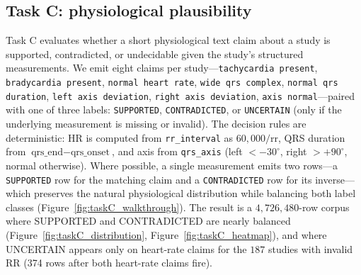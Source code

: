 \documentclass[12pt,letterpaper]{article}
\begin{document}
\begin{table}[!ht]
\centering
\caption{Task~B per-bin positive count per query (computed by streaming \texttt{taskB\_temporal\_grounding.jsonl}; total studies $=799{,}706$). The non-uniform within-query pattern across the ten bins is the quantitative counterpart of Figure~\ref{fig:taskB_local} and rules out the trivial all-bins-equal degenerate solution.}
\label{tab:taskB_perbin}
\renewcommand{\arraystretch}{1.15}
\end{table}

\subsection*{Task C: physiological plausibility}

Task C evaluates whether a short physiological text claim about a study is supported, contradicted, or undecidable given the study's structured measurements. We emit eight claims per study---\texttt{tachycardia present}, \texttt{bradycardia present}, \texttt{normal heart rate}, \texttt{wide qrs complex}, \texttt{normal qrs duration}, \texttt{left axis deviation}, \texttt{right axis deviation}, \texttt{axis normal}---paired with one of three labels: \texttt{SUPPORTED}, \texttt{CONTRADICTED}, or \texttt{UNCERTAIN} (only if the underlying measurement is missing or invalid). The decision rules are deterministic: HR is computed from \texttt{rr\_interval} as $60{,}000/\text{rr}$, QRS duration from $\text{qrs\_end}-\text{qrs\_onset}$, and axis from \texttt{qrs\_axis} (left $<-30^\circ$, right $>+90^\circ$, normal otherwise). Where possible, a single measurement emits two rows---a \texttt{SUPPORTED} row for the matching claim and a \texttt{CONTRADICTED} row for its inverse---which preserves the natural physiological distribution while balancing both label classes (Figure~\ref{fig:taskC_walkthrough}). The result is a $4{,}726{,}480$-row corpus where SUPPORTED and CONTRADICTED are nearly balanced (Figure~\ref{fig:taskC_distribution}, Figure~\ref{fig:taskC_heatmap}), and where UNCERTAIN appears only on heart-rate claims for the $187$ studies with invalid RR (374 rows after both heart-rate claims fire).
\end{document}

